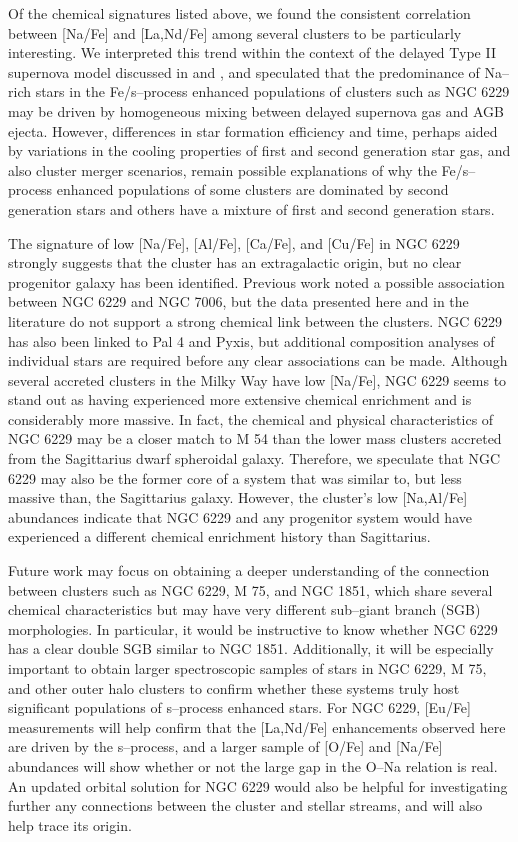 \documentclass[12pt,preprint]{emulateapj}
\begin{document}
Of the chemical signatures listed above, we found the consistent correlation 
between [Na/Fe] and [La,Nd/Fe] among several clusters to be particularly 
interesting.  We interpreted this trend within the context of the delayed 
Type II supernova model discussed in \citet{D'Antona16} and \citet{D'Ercole16},
and speculated that the predominance of Na--rich stars in the Fe/s--process
enhanced populations of clusters such as NGC 6229 may be driven by homogeneous 
mixing between delayed supernova gas and AGB ejecta.  However, differences in 
star formation efficiency and time, perhaps aided by variations in the cooling
properties of first and second generation star gas, and also cluster merger 
scenarios, remain possible explanations of why the Fe/s--process enhanced
populations of some clusters are dominated by second generation stars and
others have a mixture of first and second generation stars.

The signature of low [Na/Fe], [Al/Fe], [Ca/Fe], and [Cu/Fe]
in NGC 6229 strongly suggests that the cluster has an extragalactic origin,
but no clear progenitor galaxy has been identified.  Previous work noted a
possible association between NGC 6229 and NGC 7006, but the data presented here
and in the literature do not support a strong chemical link between the 
clusters.  NGC 6229 has also been linked to Pal 4 and Pyxis, but additional
composition analyses of individual stars are required before any clear 
associations can be made.  Although several accreted clusters in the Milky Way 
have low [Na/Fe], NGC 6229 seems to stand out as having experienced more 
extensive chemical enrichment and is considerably more massive.  In fact, 
the chemical and physical characteristics of NGC 6229 may be a closer match to 
M 54 than the lower mass clusters accreted from the Sagittarius dwarf 
spheroidal galaxy.  Therefore, we speculate that NGC 6229 may also be the 
former core of a system that was similar to, but less massive than, the 
Sagittarius galaxy.  However, the cluster's low [Na,Al/Fe] abundances 
indicate that NGC 6229 and any progenitor system would have experienced a 
different chemical enrichment history than Sagittarius.

Future work may focus on obtaining a deeper understanding of the connection
between clusters such as NGC 6229, M 75, and NGC 1851, which share several
chemical characteristics but may have very different sub--giant branch (SGB)
morphologies.  In particular, it would be instructive to know whether NGC 6229
has a clear double SGB similar to NGC 1851.  Additionally, it will be 
especially important to obtain larger spectroscopic samples of stars in NGC 
6229, M 75, and other outer halo clusters to confirm whether these systems 
truly host significant populations of s--process enhanced stars.  For NGC 6229,
[Eu/Fe] measurements will help confirm that the [La,Nd/Fe] enhancements 
observed here are driven by the s--process, and a larger sample of [O/Fe] and 
[Na/Fe] abundances will show whether or not the large gap in the O--Na relation
is real.  An updated orbital solution for NGC 6229 would also be helpful
for investigating further any connections between the cluster and stellar 
streams, and will also help trace its origin.  
\end{document}
